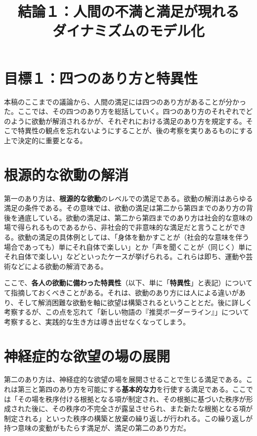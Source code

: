 \documentclass[8pt, a5paper]{ltjsarticle}
\title{結論１：人間の不満と満足が現れる\\ダイナミズムのモデル化}
\author{}
\date{}
\begin{document}
\maketitle

\section{目標１：四つのあり方と特異性}\label{ux76eeux6a19uxff11ux56dbux3064ux306eux3042ux308aux65b9ux3068ux7279ux7570ux6027}

本稿のここまでの議論から、人間の満足には四つのあり方があることが分かった。ここでは、その四つのあり方を総括していく。四つのあり方のそれぞれでどのように欲動が解消されるかが、それぞれにおける満足のあり方を規定する。そこで特異性の観点を忘れないようにすることが、後の考察を実りあるものにする上で決定的に重要となる。

\section{根源的な欲動の解消}\label{ux6839ux6e90ux7684ux306aux6b32ux52d5ux306eux89e3ux6d88}

第一のあり方は、\textbf{根源的な欲動}のレベルでの満足である。欲動の解消はあらゆる満足の条件である。その意味では、欲動の満足は第二から第四までのあり方の背後を通底している。欲動の満足は、第二から第四までのあり方は社会的な意味の場で得られるものであるから、非社会的で非意味的な満足だと言うことができる。欲動の満足の具体例としては、「身体を動かすことが（社会的な意味を伴う場合であっても）単にそれ自体で楽しい」とか「声を聞くことが（同じく）単にそれ自体で楽しい」などといったケースが挙げられる。これらは即ち、運動や芸術などによる欲動の解消である。

ここで、\textbf{各人の欲動に備わった特異性}（以下、単に「\textbf{特異性}」と表記）についてて指摘しておくべきことがある。それは、欲動のあり方には人による違いがあり、そして解消困難な欲動を軸に欲望は構築されるということとだ。後に詳しく考察するが、この点を忘れて「新しい物語の『推奨ボーダーライン』」について考察すると、実践的な生き方は導き出せなくなってしまう。

\section{神経症的な欲望の場の展開}\label{ux795eux7d4cux75c7ux7684ux306aux6b32ux671bux306eux5834ux306eux5c55ux958b}

第二のあり方は、神経症的な欲望の場を展開させることで生じる満足である。これは第三と第四のあり方を可能にする\textbf{基本的な力}を行使する満足である。ここでは「その場を秩序付ける根拠となる項が制定され、その根拠に基づいた秩序が形成された後に、その秩序の不完全さが露呈させられ、また新たな根拠となる項が制定される」といった秩序の構築と放棄の繰り返しが行われる。この繰り返しが持つ意味の変動がもたらす満足が、満足の第二のあり方だ。
\end{document}
